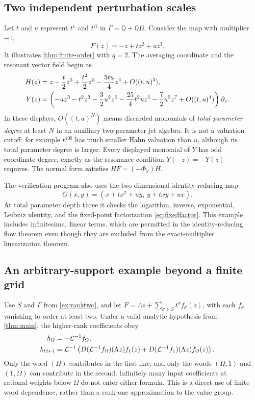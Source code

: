 \documentclass[11pt,letterpaper]{article}
\theoremstyle{definition}
\theoremstyle{remark}
\newcommand{\Q}{\mathbb Q}
\newcommand{\Li}{\mathcal L}
\numberwithin{equation}{section}
\begin{document}
\subsection{Two independent perturbation scales}
Let $t$ and $u$ represent $t^1$ and $t^\Omega$ in
$\Gamma=\Q+\Q\Omega$. Consider the map with multiplier $-1$,
\[
 F(z)=-z+tz^2+uz^3.
\]
It illustrates \cref{thm:finite-order} with $q=2$. The averaging coordinate
and the resonant vector field begin as
\begin{align}\label{eq:resonant-example}
 H(z)&=z-\frac{t}{2}z^2+\frac{t^2}{2}z^3-\frac{5tu}{4}z^4
                  +O((t,u)^3),\\
 Y(z)&=\left(-uz^3-t^2z^3-\frac32u^2z^5
              -\frac{25}{4}t^2uz^5-\frac72u^3z^7
              +O((t,u)^4)\right)\partial_z.\notag
\end{align}
In these displays, $O((t,u)^N)$ means discarded monomials of \emph{total
parameter degree} at least $N$ in an auxiliary two-parameter jet algebra.
It is not a valuation cutoff: for example $t^{100}$ has much smaller Hahn
valuation than $u$, although its total parameter degree is larger.
Every displayed monomial of $Y$ has odd coordinate degree, exactly as the
resonance condition $Y(-z)=-Y(z)$ requires. The normal form satisfies
$HF=(-\Phi_Y)H$.

The verification program also uses the two-dimensional identity-reducing map
\[
 G(x,y)=(x+tx^2+uy,\ y+txy+ux).
\]
At total parameter depth three it checks the logarithm, inverse, exponential,
Leibniz identity, and the fixed-point factorization
\eqref{eq:fixedfactor}. This example includes infinitesimal linear terms,
which are permitted in the identity-reducing flow theorem even though they
are excluded from the exact-multiplier linearization theorem.

\subsection{An arbitrary-support example beyond a finite grid}
Use $S$ and $\Gamma$ from \cref{ex:ranktwo}, and let
$F=\Lambda z+\sum_{\sigma\in S}t^\sigma f_\sigma(z)$, with each
$f_\sigma$ vanishing to order at least two. Under a valid analytic
hypothesis from \cref{thm:main}, the higher-rank coefficients obey
\begin{align}\label{eq:Omega-example}
 h_\Omega&=-\Li^{-1}f_\Omega,\\
 h_{\Omega+1}&=\Li^{-1}\left(
       D(\Li^{-1}f_\Omega)(\Lambda z)f_1(z)
      +D(\Li^{-1}f_1)(\Lambda z)f_\Omega(z)\right).\notag
\end{align}
Only the word $(\Omega)$ contributes in the first line, and only the words
$(\Omega,1)$ and $(1,\Omega)$ can contribute in the second. Infinitely
many input coefficients at rational weights below $\Omega$ do not enter
either formula. This is a direct use of finite word dependence, rather than
a rank-one approximation to the value group.
\end{document}
